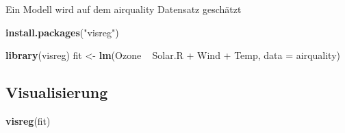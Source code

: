 \documentclass[]{article}
\newenvironment{Shaded}{\begin{snugshade}}{\end{snugshade}}
\newcommand{\KeywordTok}[1]{\textcolor[rgb]{0.13,0.29,0.53}{\textbf{{#1}}}}
\newcommand{\DataTypeTok}[1]{\textcolor[rgb]{0.13,0.29,0.53}{{#1}}}
\newcommand{\StringTok}[1]{\textcolor[rgb]{0.31,0.60,0.02}{{#1}}}
\newcommand{\NormalTok}[1]{{#1}}
\begin{document}
Ein Modell wird auf dem airquality Datensatz geschätzt

\begin{Shaded}
\begin{Highlighting}[]
\KeywordTok{install.packages}\NormalTok{(}\StringTok{"visreg"}\NormalTok{)}
\end{Highlighting}
\end{Shaded}

\begin{Shaded}
\begin{Highlighting}[]
\KeywordTok{library}\NormalTok{(visreg)}
\NormalTok{fit <-}\StringTok{ }\KeywordTok{lm}\NormalTok{(Ozone ~}\StringTok{ }\NormalTok{Solar.R +}\StringTok{ }\NormalTok{Wind +}\StringTok{ }\NormalTok{Temp, }\DataTypeTok{data =} \NormalTok{airquality)}
\end{Highlighting}
\end{Shaded}

\subsection{Visualisierung}\label{visualisierung}

\begin{Shaded}
\begin{Highlighting}[]
\KeywordTok{visreg}\NormalTok{(fit)}
\end{Highlighting}
\end{Shaded}
\end{document}
